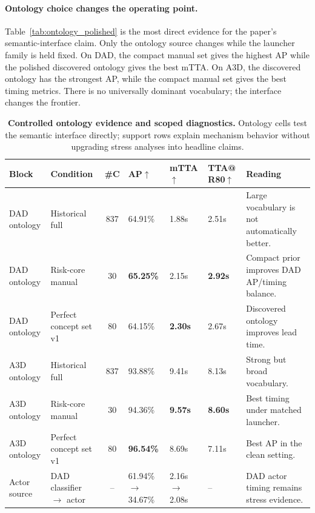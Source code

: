 \documentclass[11pt]{article}
\begin{document}
\paragraph{Ontology choice changes the operating point.}
Table~\ref{tab:ontology_polished} is the most direct evidence for the paper's
semantic-interface claim. Only the ontology source changes while the launcher
family is held fixed. On DAD, the compact manual set gives the highest AP while
the polished discovered ontology gives the best mTTA. On A3D, the discovered
ontology has the strongest AP, while the compact manual set gives the best
timing metrics. There is no universally dominant vocabulary; the interface
changes the frontier.

\begin{table}[t]
\centering\scriptsize
\setlength{\tabcolsep}{2.3pt}
\caption{\textbf{Controlled ontology evidence and scoped diagnostics.}
Ontology cells test the semantic interface directly; support rows explain
mechanism behavior without upgrading stress analyses into headline claims.}
\label{tab:ontology_polished}
\label{tab:concept_sets}
\label{tab:ablation}
\label{tab:trigger_compare}
\label{tab:interp_quant}
\begin{tabular}{p{}p{}cp{}p{}p{}p{}}
\toprule
Block & Condition & \#C & AP$\uparrow$ & mTTA$\uparrow$ & \makecell{TTA@\\R80$\uparrow$} & Reading \\
\midrule
DAD ontology & Historical full & 837 & 64.91\% & 1.88s & 2.51s & Large vocabulary is not automatically better. \\
DAD ontology & Risk-core manual & 30 & \textbf{65.25\%} & 2.15s & \textbf{2.92s} & Compact prior improves DAD AP/timing balance. \\
DAD ontology & Perfect concept set v1 & 80 & 64.15\% & \textbf{2.30s} & 2.67s & Discovered ontology improves lead time. \\
\midrule
A3D ontology & Historical full & 837 & 93.88\% & 9.41s & 8.13s & Strong but broad vocabulary. \\
A3D ontology & Risk-core manual & 30 & 94.36\% & \textbf{9.57s} & \textbf{8.60s} & Best timing under matched launcher. \\
A3D ontology & Perfect concept set v1 & 80 & \textbf{96.54\%} & 8.69s & 7.11s & Best AP in the clean setting. \\
\midrule
Actor source & \makecell[l]{DAD classifier\\$\rightarrow$ actor} & -- & \makecell[l]{61.94\%\\$\rightarrow$34.67\%} & \makecell[l]{2.16s\\$\rightarrow$2.08s} & -- & DAD actor timing remains stress evidence. \\

\end{tabular}
\end{table}
\end{document}
